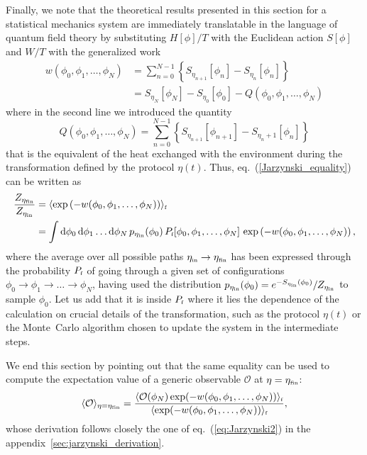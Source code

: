 \documentclass[11pt]{article}
\newcommand{\dd}{{\rm{d}}}
\newcommand{\etain}{\eta_{\mbox{\tiny{in}}}}
\newcommand{\etafin}{\eta_{\mbox{\tiny{fin}}}}
\begin{document}
Finally, we note that the theoretical results presented in this section for a statistical mechanics system are immediately translatable in the language of quantum field theory by substituting $H[\phi]/T$ with the Euclidean action $S[\phi]$ and $W/T$ with the generalized work
\begin{align}
\label{eq:w_stochastic}
 w(\phi_0,\phi_1,\dots , \phi_N)
  &= \sum_{n=0}^{N-1} \left\{ S_{\eta_{n+1}} \left[\phi_n\right] - S_{\eta_n}\left[\phi_n\right] \right\} \\
  &= S_{\eta_{N}} \left[\phi_N\right] - S_{\eta_0} \left[\phi_0\right] - Q(\phi_0,\phi_1,\dots , \phi_N)
\end{align}
where in the second line we introduced the quantity
\begin{equation}
\label{eq:Q_stochastic}
 Q(\phi_0,\phi_1,\dots , \phi_N) = \sum_{n=0}^{N-1} \left\{ S_{\eta_{n+1}} \left[\phi_{n+1}\right] - S_{\eta_n+1}\left[\phi_n\right] \right\}
\end{equation}
that is the equivalent of the heat exchanged with the environment during the transformation defined by the protocol $\eta(t)$. Thus, eq.~(\ref{Jarzynski_equality}) can be written as
\begin{align}
\label{eq:Jarzynski2}
\frac{Z_{\etafin}}{Z_{\etain}} 
 &= \langle \exp \left( -w(\phi_0,\phi_1,\dots , \phi_N) \right)  \rangle_{\mbox{\tiny{f}}} \nonumber \\
 &= \int \dd \phi_0  \, \dd \phi_1 \dots \dd \phi_N \, p_{\etain}(\phi_0) \, P_{\mbox{\tiny{f}}}[\phi_0,\phi_1,\dots, \phi_N] \, \exp \left( -w(\phi_0,\phi_1,\dots , \phi_N) \right),
\end{align}
where the average over all possible paths $\etain \to \etafin$ has been expressed through the probability $P_{\mbox{\tiny{f}}}$ of going through a given set of configurations $\phi_0 \to \phi_1 \to \dots \to \phi_N$, having used the distribution $p_{\etain}(\phi_0) = e^{-S_{\etain}(\phi_0)}/Z_{\etain}$ to sample $\phi_0$. Let us add that it is inside $P_{\mbox{\tiny{f}}}$ where it lies the dependence of the calculation on crucial details of the transformation, such as the protocol $\eta(t)$ or the Monte~Carlo algorithm chosen to update the system in the intermediate steps.

We end this section by pointing out that the same equality can be used to compute the expectation value of a generic observable $\mathcal{O}$ at $\eta = \etafin$:
\begin{equation}
\label{eq:expectation_value_0}
\langle \mathcal{O} \rangle_{\eta=\etafin} = \frac{\langle \mathcal{O}(\phi_N) \exp(-w(\phi_0,\phi_1,\dots , \phi_N)) \rangle_{\mbox{\tiny{f}}}}{\langle \exp(-w(\phi_0,\phi_1,\dots , \phi_N)) \rangle_{\mbox{\tiny{f}}}},
\end{equation}
whose derivation follows closely the one of eq.~(\ref{eq:Jarzynski2}) in the appendix~\ref{sec:jarzynski_derivation}. 
\end{document}
